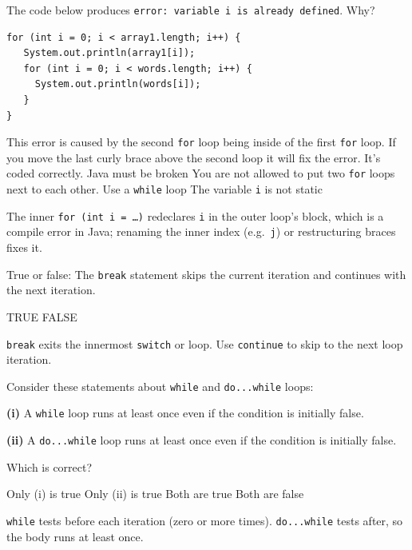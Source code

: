 \question[4]
The code below produces \texttt{error: variable i is already defined}. Why?
\begin{lstlisting}[style=java]
for (int i = 0; i < array1.length; i++) {
   System.out.println(array1[i]);
   for (int i = 0; i < words.length; i++) {
     System.out.println(words[i]);
   }
}
\end{lstlisting}
\begin{choices}
  \CorrectChoice This error is caused by the second \lstinline!for! loop being inside of the first \lstinline!for! loop. If you move the last curly brace above the second loop it will fix the error.
  \choice It's coded correctly. Java must be broken
  \choice You are not allowed to put two \lstinline!for! loops next to each other. Use a \lstinline!while! loop
  \choice The variable \lstinline!i! is not static
\end{choices}
\begin{solution}
  The inner \texttt{for (int i = \ldots)} redeclares \texttt{i} in the outer loop's block, which is a compile error in Java; renaming the inner index (e.g.\ \texttt{j}) or restructuring braces fixes it.
\end{solution}

\question[4]
True or false: The \texttt{break} statement skips the current iteration and continues with the next iteration.
\begin{choices}
  \choice TRUE
  \CorrectChoice FALSE
\end{choices}
\begin{solution}
  \texttt{break} exits the innermost \texttt{switch} or loop. Use \texttt{continue} to skip to the next loop iteration.
\end{solution}

\question[4]
Consider these statements about \texttt{while} and \texttt{do...while} loops:

\noindent\textbf{(i)} A \texttt{while} loop runs at least once even if the condition is initially false.

\noindent\textbf{(ii)} A \texttt{do...while} loop runs at least once even if the condition is initially false.

\noindent Which is correct?
\begin{choices}
  \choice Only (i) is true
  \CorrectChoice Only (ii) is true
  \choice Both are true
  \choice Both are false
\end{choices}
\begin{solution}
  \texttt{while} tests before each iteration (zero or more times). \texttt{do...while} tests after, so the body runs at least once.
\end{solution}

